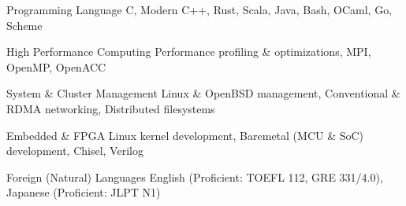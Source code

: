 

\begin{cvskills}

  \cvskill
    {Programming Language} %
    {C, Modern C++, Rust, Scala, Java, Bash, OCaml, Go, Scheme} %

  \cvskill
    {High Performance Computing} %
    {Performance profiling \& optimizations, MPI, OpenMP, OpenACC} %

  \cvskill
    {System \& Cluster Management} %
    {Linux \& OpenBSD management, Conventional \& RDMA networking, Distributed filesystems} %

  \cvskill
    {Embedded \& FPGA}
    {Linux kernel development, Baremetal (MCU \& SoC) development, Chisel, Verilog}


  \cvskill
    {Foreign (Natural) Languages} %
    {English (Proficient: TOEFL 112, GRE 331/4.0), Japanese (Proficient: JLPT N1)} %

\end{cvskills}
